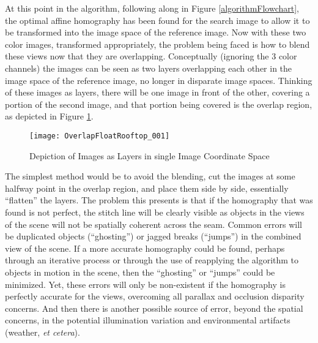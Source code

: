 %
%
%
%
%
%
%
%
%

%
%
%



At this point in the algorithm, following along in Figure \ref{algorithmFlowchart}, the optimal affine homography has been found for the search image to allow it to be transformed into the image space of the reference image. Now with these two color images, transformed appropriately, the problem being faced is how to blend these views now that they are overlapping. Conceptually (ignoring the 3 color channels) the images can be seen as two layers overlapping each other in the image space of the reference image, no longer in disparate image spaces. Thinking of these images as layers, there will be one image in front of the other, covering a portion of the second image, and that portion being covered is the overlap region, as depicted in Figure \ref{layerImages}.

\begin{figure}
\centering
\texttt{[image: OverlapFloatRooftop\_001]}
\caption{Depiction of Images as Layers in single Image Coordinate Space}
\label{layerImages}
\end{figure}

The simplest method would be to avoid the blending, cut the images at some halfway point in the overlap region, and place them side by side, essentially ``flatten'' the layers. The problem this presents is that if the homography that was found is not perfect, the stitch line will be clearly visible as objects in the views of the scene will not be spatially coherent across the seam. Common errors will be duplicated objects (``ghosting'') or jagged breaks (``jumps'') in the combined view of the scene. If a more accurate homography could be found, perhaps through an iterative process or through the use of reapplying the algorithm to objects in motion in the scene, then the ``ghosting'' or ``jumps'' could be minimized. Yet, these errors will only be non-existent if the homography is perfectly accurate for the views, overcoming all parallax and occlusion disparity concerns. And then there is another possible source of error, beyond the spatial concerns, in the potential illumination variation and environmental artifacts (weather, \textit{et cetera}).


